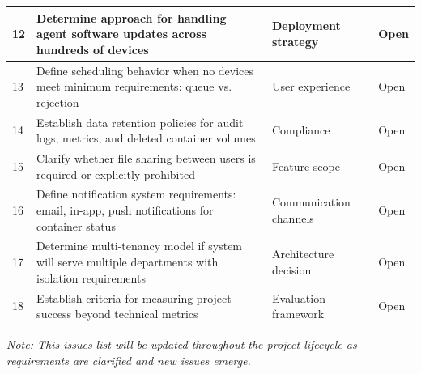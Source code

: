 \documentclass[12pt,a4paper]{article}
\begin{document}
\begin{longtable}{|p{1cm}|p{5cm}|p{4cm}|p{2.5cm}|}
    12 & Determine approach for handling agent software updates across hundreds of devices & Deployment strategy & Open \\
    \hline
    
    13 & Define scheduling behavior when no devices meet minimum requirements: queue vs. rejection & User experience & Open \\
    \hline
    
    14 & Establish data retention policies for audit logs, metrics, and deleted container volumes & Compliance & Open \\
    \hline
    
    15 & Clarify whether file sharing between users is required or explicitly prohibited & Feature scope & Open \\
    \hline
    
    16 & Define notification system requirements: email, in-app, push notifications for container status & Communication channels & Open \\
    \hline
    
    17 & Determine multi-tenancy model if system will serve multiple departments with isolation requirements & Architecture decision & Open \\
    \hline
    
    18 & Establish criteria for measuring project success beyond technical metrics & Evaluation framework & Open \\
    \hline
\end{longtable}

\textit{Note: This issues list will be updated throughout the project lifecycle as requirements are clarified and new issues emerge.}
\end{document}
